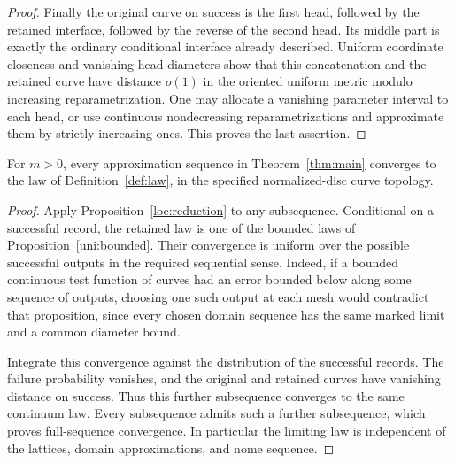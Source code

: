 \begin{proof}
Finally the original curve on success
is the first head, followed by the
retained interface, followed by the
reverse of the second head. Its
middle part is exactly the ordinary
conditional interface already described.
Uniform coordinate closeness and
vanishing head diameters show that
this concatenation and the retained
curve have distance \(o(1)\) in the
oriented uniform metric modulo
increasing reparametrization. One may
allocate a vanishing parameter interval
to each head, or use continuous
nondecreasing reparametrizations and
approximate them by strictly increasing
ones. This proves the last assertion.
\end{proof}

\begin{corollary}
\label{loc:universality}
For \(m>0\), every approximation sequence in
Theorem~\ref{thm:main} converges to the law of
Definition~\ref{def:law}, in the specified
normalized-disc curve topology.
\end{corollary}

\begin{proof}
Apply Proposition~\ref{loc:reduction} to any subsequence.
Conditional on a successful record, the retained law
is one of the bounded laws of
Proposition~\ref{uni:bounded}. Their convergence is
uniform over the possible successful outputs in
the required sequential sense. Indeed, if a
bounded continuous test function of curves
had an error bounded below along some sequence
of outputs, choosing one such output at
each mesh would contradict that proposition,
since every chosen domain sequence has
the same marked limit and a common diameter
bound.

Integrate this convergence against the
distribution of the successful records.
The failure probability vanishes, and
the original and retained curves have
vanishing distance on success.
Thus this further subsequence converges
to the same continuum law. Every
subsequence admits such a further
subsequence, which proves full-sequence
convergence. In particular the limiting
law is independent of the lattices,
domain approximations, and nome sequence.
\end{proof}

